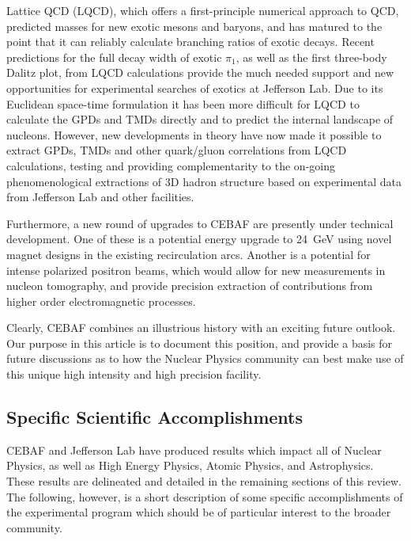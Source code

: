 Lattice QCD (LQCD), which offers a first-principle numerical
approach to QCD, predicted masses for new exotic mesons and baryons, and has matured to the point that it can reliably calculate  branching ratios of exotic decays.  Recent predictions for the full decay width of exotic $\pi_1$, as well as the first three-body Dalitz plot, from LQCD calculations
provide the much needed support and new opportunities for experimental searches of exotics at Jefferson Lab.  
Due to its Euclidean space-time formulation it has been more 
difficult for LQCD to calculate the GPDs and TMDs directly and to predict 
the internal landscape of nucleons. However, new developments in theory 
have now made it possible to extract GPDs, TMDs and other quark/gluon 
correlations from LQCD calculations, testing and providing complementarity to the on-going 
phenomenological extractions of 3D hadron structure based on 
experimental data from Jefferson Lab and other facilities.

Furthermore, a new round of upgrades to CEBAF are presently under technical development. One of these is a potential energy upgrade to 24~GeV using novel magnet designs in the existing recirculation arcs. Another is a potential for intense polarized positron beams, which would allow for new measurements in nucleon tomography, and provide precision extraction of contributions from higher order electromagnetic processes. 

Clearly, CEBAF combines an illustrious history with an exciting future outlook. Our purpose in this article is to document this position, and provide a basis for future discussions as to how the Nuclear Physics community can best make use of this unique high intensity and high precision facility.

\subsection{Specific Scientific Accomplishments}

CEBAF and Jefferson Lab have produced results which impact all of Nuclear Physics, as well as High Energy Physics, Atomic Physics, and Astrophysics. These results are delineated and detailed in the remaining sections of this review. The following, however, is a short description of some specific accomplishments of the experimental program which should be of particular interest to the broader community.

